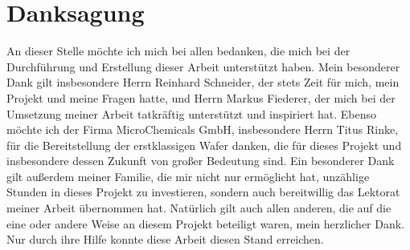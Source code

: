 \documentclass[12pt, a4paper]{article}
\begin{document}
\section*{Danksagung}
An dieser Stelle möchte ich mich bei allen bedanken, die mich bei der Durchführung und Erstellung dieser Arbeit unterstützt haben.\newline
Mein besonderer Dank gilt insbesondere Herrn Reinhard Schneider, der stets Zeit für mich, mein Projekt und meine Fragen hatte, und Herrn Markus Fiederer, der mich bei der Umsetzung meiner Arbeit tatkräftig unterstützt und inspiriert hat.\newline
Ebenso möchte ich der Firma MicroChemicals GmbH, insbesondere Herrn Titus Rinke, für die Bereitstellung der erstklassigen Wafer danken, die für dieses Projekt und insbesondere dessen Zukunft von großer Bedeutung sind.\newline
Ein besonderer Dank gilt außerdem meiner Familie, die mir nicht nur ermöglicht hat, unzählige Stunden in dieses Projekt zu investieren, sondern auch bereitwillig das Lektorat meiner Arbeit übernommen hat.\newline
Natürlich gilt auch allen anderen, die auf die eine oder andere Weise an diesem Projekt beteiligt waren, mein herzlicher Dank. Nur durch ihre Hilfe konnte diese Arbeit diesen Stand erreichen.\pagebreak



\end{document}
